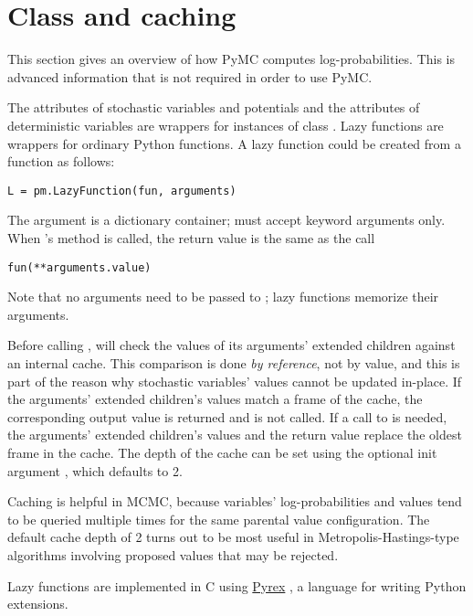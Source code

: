 \section[Class LazyFunction and caching]{Class 
and caching}
\label{sec:caching}
This section gives an overview of how PyMC computes log-probabilities. This is advanced information that is not required in order to use PyMC.

The  attributes of stochastic variables and potentials and the  attributes of deterministic variables are wrappers for instances of class . Lazy functions are wrappers for ordinary Python functions. A lazy function  could be created from a function  as follows:
\begin{verbatim}
L = pm.LazyFunction(fun, arguments)
\end{verbatim}
The argument  is a dictionary container;  must accept keyword arguments only. When 's  method is called, the return value is the same as the call
\begin{verbatim}
fun(**arguments.value)
\end{verbatim}
Note that no arguments need to be passed to ; lazy functions memorize their arguments.

Before calling ,  will check the values of its arguments' extended children against an internal cache. This comparison is done \emph{by reference}, not by value, and this is part of the reason why stochastic variables' values cannot be updated in-place. If the arguments' extended children's values match a frame of the cache, the corresponding output value is returned and  is not called. If a call to  is needed, the arguments' extended children's values and the return value replace the oldest frame in the cache. The depth of the cache can be set using the optional init argument , which defaults to 2.

Caching is helpful in MCMC, because variables' log-probabilities and values tend to be queried multiple times for the same parental value configuration. The default cache depth of 2 turns out to be most useful in Metropolis-Hastings-type algorithms involving proposed values that may be rejected.

Lazy functions are implemented in C using \href{http://www.cosc.canterbury.ac.nz/greg.ewing/python/Pyrex/}{Pyrex} , a language for writing Python extensions.

